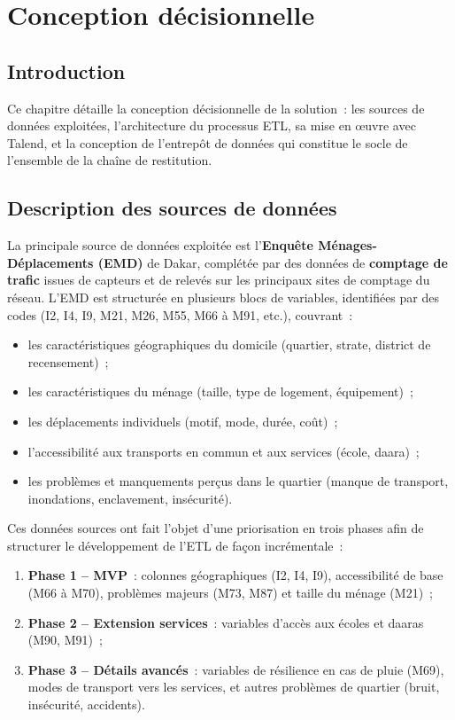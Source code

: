 \chapter{Conception décisionnelle}
\label{ch:decisionnel}

\section{Introduction}
Ce chapitre détaille la conception décisionnelle de la solution~: les sources de données exploitées, l'architecture du processus ETL, sa mise en œuvre avec Talend, et la conception de l'entrepôt de données qui constitue le socle de l'ensemble de la chaîne de restitution.

\section{Description des sources de données}
La principale source de données exploitée est l'\textbf{Enquête Ménages-Déplacements (EMD)} de Dakar, complétée par des données de \textbf{comptage de trafic} issues de capteurs et de relevés sur les principaux sites de comptage du réseau. L'EMD est structurée en plusieurs blocs de variables, identifiées par des codes (I2, I4, I9, M21, M26, M55, M66 à M91, etc.), couvrant~:
\begin{itemize}
\item les caractéristiques géographiques du domicile (quartier, strate, district de recensement)~;
\item les caractéristiques du ménage (taille, type de logement, équipement)~;
\item les déplacements individuels (motif, mode, durée, coût)~;
\item l'accessibilité aux transports en commun et aux services (école, daara)~;
\item les problèmes et manquements perçus dans le quartier (manque de transport, inondations, enclavement, insécurité).
\end{itemize}

Ces données sources ont fait l'objet d'une priorisation en trois phases afin de structurer le développement de l'ETL de façon incrémentale~:
\begin{enumerate}
\item \textbf{Phase 1 -- MVP}~: colonnes géographiques (I2, I4, I9), accessibilité de base (M66 à M70), problèmes majeurs (M73, M87) et taille du ménage (M21)~;
\item \textbf{Phase 2 -- Extension services}~: variables d'accès aux écoles et daaras (M90, M91)~;
\item \textbf{Phase 3 -- Détails avancés}~: variables de résilience en cas de pluie (M69), modes de transport vers les services, et autres problèmes de quartier (bruit, insécurité, accidents).
\end{enumerate}

